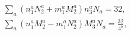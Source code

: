 \begin{equation}
\begin{aligned} 
& \sum_a\left(n^a_1 N^a_2+m^a_1 M^a_2\right)n^a_3 N_a = 32,\\
& \sum_a\left(n^a_1 M^a_2-m^a_1 N^a_2\right)M^a_3 N_a = \frac{32}{4^b},\\
\end{aligned}\label{EqRRtadpoles}
\end{equation}

